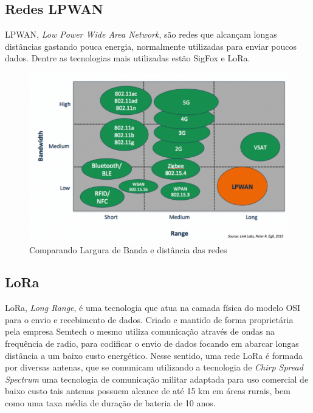 \documentclass[
article,			%
12pt,				%
oneside,			%
a4paper,			%
english,			%
brazil,				%
sumario=tradicional
]{abntex2}
\begin{document}
\subsection{Redes LPWAN}\label{Redes LPWAN}
LPWAN, \textit{Low Power Wide Area Network}, são redes que alcançam longas distâncias gastando pouca energia, normalmente utilizadas para enviar poucos dados\cite{introducao_lpwan_2017}. Dentre as tecnologias mais utilizadas estão SigFox e LoRa. 
\begin{figure}[!htb]
    \centering
    \includegraphics[width=.9\textwidth]{Comparativo-algumas-redes}
    \caption{\label{fig:Comparativo-algumas-redes}Comparando Largura de Banda e distância das redes\cite{introducao_lpwan_2017}}
\end{figure}

\subsection{LoRa}\label{LoRa}
LoRa, \textit{Long Range}, é uma tecnologia que atua na camada física do modelo OSI para o envio e recebimento de dados. Criado e mantido de forma proprietária pela empresa Semtech\cite{bor2016lora} o mesmo utiliza comunicação através de ondas na frequência de radio, para codificar o envio de dados focando em abarcar longas distância a um baixo custo energético. Nesse sentido, uma rede LoRa é formada por diversas antenas\cite{siteLorawan}, que se comunicam utilizando a tecnologia de \textit{Chirp Spread Spectrum}\cite{davcev2018iot} uma tecnologia de comunicação militar adaptada para uso comercial de baixo custo\cite{siteLorawan} tais antenas possuem alcance de até 15 km em áreas rurais\cite{adelantado2017understanding}, bem como uma taxa média de duração de bateria de 10 anos\cite{adelantado2017understanding}.
\end{document}
